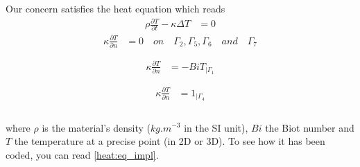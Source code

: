 Our concern satisfies the heat equation which reads 
\begin{equation}
\label{heat:eq}
   \begin{split}
      \displaystyle{\rho \frac{ \partial T}{\partial t}}  -  \kappa \Delta T & = 0
  \end{split}
\end{equation}
\begin{equation}
\label{hom_neu}
   \begin{split}
      \displaystyle{ \kappa \frac{\partial T}{\partial n}} & =  0 \quad on \quad \Gamma_2,\Gamma_5, \Gamma_6 \quad and \quad \Gamma_7 \\ \\ 
  \end{split}
\end{equation}
\begin{equation}
\label{classic_neu}
   \begin{split}
      \displaystyle{ \kappa \frac{\partial T}{\partial n}} & = - Bi T_{ | \Gamma_1 } \\ \\
  \end{split}
\end{equation}
\begin{equation}
\label{nonhom_neu}
   \begin{split}
      \displaystyle{ \kappa \frac{\partial T}{\partial n}} & =  1_{| \Gamma_4} \\ \\
  \end{split}
\end{equation}

where $\rho$ is the material's density ($kg.m^{-3}$ in the SI unit), $Bi$ the Biot number and $T$ the temperature at a precise point (in 2D or 3D). To see how it has been coded, you can read \ref{heat:eq_impl}.

%


